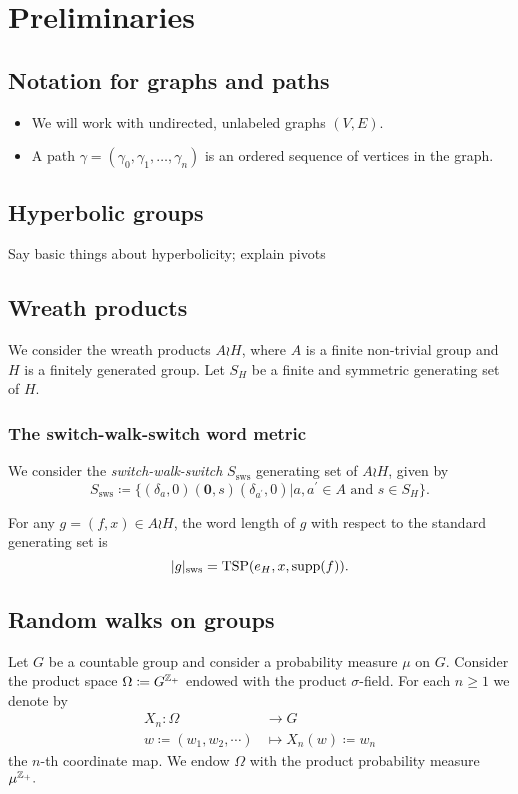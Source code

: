 \section{Preliminaries}
\subsection{Notation for graphs and paths}
\begin{itemize}
	\item We will work with undirected, unlabeled graphs $(V,E)$.
	\item A path $\gamma=(\gamma_0,\gamma_1,\ldots, \gamma_n)$ is an ordered sequence of vertices in the graph.
\end{itemize}

\subsection{Hyperbolic groups}
Say basic things about hyperbolicity; explain pivots

\subsection{Wreath products}
We consider the wreath products $A\wr H$, where $A$ is a finite non-trivial group and $H$ is a finitely generated group. Let $S_H$ be a finite and symmetric generating set of $H$. 

\subsubsection{The switch-walk-switch word metric}\label{subsubsection: the sws word metric}
We consider the \emph{switch-walk-switch} $S_{\mathrm{sws}}$ generating set of $A\wr H$, given by
\[
S_{\mathrm{sws}}\coloneqq \Big\{ (\delta_a,0)(\mathbf{0},s)(\delta_{a^{\prime}},0)\Big| a,a^{\prime}\in A\text{ and }s\in S_H \Big\}.
\]

\begin{thm}
For any $g=(f,x)\in A\wr H$, the word length of $g$ with respect to the standard generating set is
	\[
	|g|_{\mathrm{sws}}=\mathrm{TSP}(e_H,x,\mathrm{supp}(f)).
	\]
\end{thm}


\subsection{Random walks on groups}
 Let $G$ be a countable group and consider a probability measure $\mu$ on $G$. Consider the product space $\Omega\coloneqq G^{\mathbb{Z}_{+}}$ endowed with the product $\sigma$-field. For each $n\ge 1$ we denote by
	\begin{equation*}
		\begin{aligned}
			X_n:\Omega&\to G\\
			w\coloneqq(w_1,w_2,\cdots)&\mapsto X_n(w)\coloneqq w_n
	\end{aligned}
	\end{equation*}
	the $n$-th coordinate map. We endow $\Omega$ with the product probability measure $\mu^{\mathbb{Z}_{+}}.$
		
